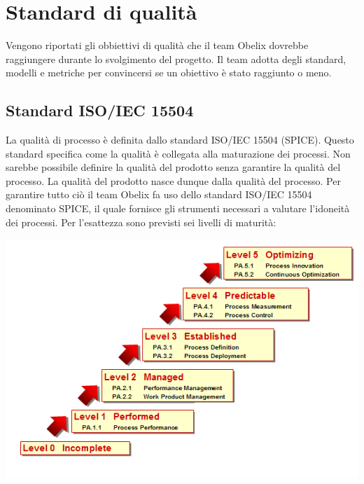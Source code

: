 {\clearpage


\appendix


\section{Standard di qualità}

Vengono riportati gli obbiettivi di qualità che il team Obelix
dovrebbe raggiungere durante lo svolgimento del progetto.  Il team
adotta degli standard, modelli e metriche per convincersi se un
obiettivo è stato raggiunto o meno. 



\subsection{Standard ISO/IEC 15504}


La qualità di processo è definita dallo standard ISO/IEC 15504 (SPICE).
Questo standard specifica come la qualità è collegata alla maturazione dei processi.
Non sarebbe possibile definire la qualità del prodotto senza garantire la
qualità del processo. La qualità del prodotto nasce dunque dalla qualità del
processo. Per garantire tutto ciò il team Obelix fa uso dello standard ISO/IEC
15504 denominato SPICE, il quale fornisce gli strumenti necessari a valutare
l’idoneità dei processi. Per l’esattezza sono previsti sei livelli di maturità:





\begin{center}
   \includegraphics[scale=0.5]{img/Iso15504.png}
\end{center} 



}
